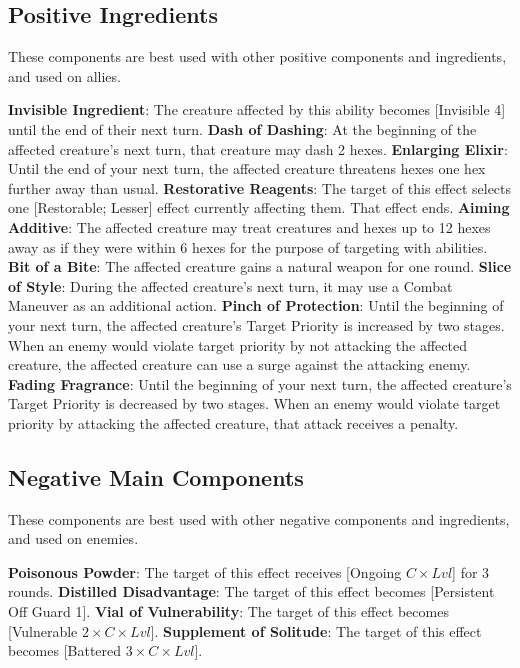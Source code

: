 \begin{multicols*}{2}
\subsection*{Positive Ingredients}
\label{alchposing}
These components are best used with other positive components and ingredients, and used on allies.
\begin{itemize}
\thing \textbf{Invisible Ingredient}: The creature affected by this ability becomes [Invisible 4] until the end of their next turn.
\thing \textbf{Dash of Dashing}: At the beginning of the affected creature’s next turn, that creature may dash 2 hexes.
\thing \textbf{Enlarging Elixir}: Until the end of your next turn, the affected creature threatens hexes one hex further away than usual.
\thing \textbf{Restorative Reagents}: The target of this effect selects one [Restorable; Lesser] effect currently affecting them. That effect ends.
\thing \textbf{Aiming Additive}: The affected creature may treat creatures and hexes up to 12 hexes away as if they were within 6 hexes for the purpose of targeting with abilities.
\thing \textbf{Bit of a Bite}: The affected creature gains a natural weapon for one round.
\thing \textbf{Slice of Style}: During the affected creature’s next turn, it may use a Combat Maneuver as an additional action.
\thing \textbf{Pinch of Protection}: Until the beginning of your next turn, the affected creature’s Target Priority is increased by two stages. When an enemy would violate target priority by not attacking the affected creature, the affected creature can use a surge against the attacking enemy.
\thing \textbf{Fading Fragrance}: Until the beginning of your next turn, the affected creature’s Target Priority is decreased by two stages. When an enemy would violate target priority by attacking the affected creature, that attack receives a penalty.
\end{itemize}

\subsection*{Negative Main Components}
\label{alchnegmain}
These components are best used with other negative components and ingredients, and used on enemies.
\begin{itemize}
\thing \textbf{Poisonous Powder}: The target of this effect receives [Ongoing $C\times Lvl$] for 3 rounds.
\thing \textbf{Distilled Disadvantage}: The target of this effect becomes [Persistent Off Guard 1].
\thing \textbf{Vial of Vulnerability}: The target of this effect becomes [Vulnerable $2\times C\times Lvl$].
\thing \textbf{Supplement of Solitude}: The target of this effect becomes [Battered $3\times C\times Lvl$].
\end{itemize}


\end{multicols*}
